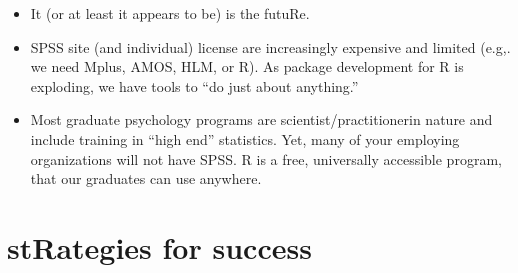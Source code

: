 \documentclass[
  english,
]{book}
\providecommand{\tightlist}{%
  \setlength{\itemsep}{0pt}\setlength{\parskip}{0pt}}
\begin{document}
\begin{itemize}
\tightlist
\item
  It (or at least it appears to be) is the futuRe.
\item
  SPSS site (and individual) license are increasingly expensive and limited (e.g,. we need Mplus, AMOS, HLM, or R). As package development for R is exploding, we have tools to ``do just about anything.''
\item
  Most graduate psychology programs are scientist/practitionerin nature and include training in ``high end'' statistics. Yet, many of your employing organizations will not have SPSS. R is a free, universally accessible program, that our graduates can use anywhere.
\end{itemize}

\hypertarget{strategies-for-success-1}{%
\section{stRategies for success}\label{strategies-for-success-1}}
\end{document}
